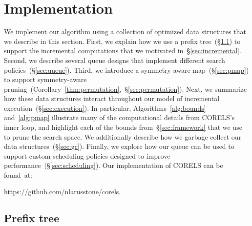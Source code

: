 

\section{Implementation}
\label{sec:implementation}

We implement our algorithm using a collection of optimized data structures
that we describe in this section.
%
First, we explain how we use a prefix tree~(\S\ref{sec:trie})
to support the incremental computations that we motivated in~\S\ref{sec:incremental}.
%
Second, we describe several queue designs
that implement different search policies~(\S\ref{sec:queue}).
%
Third, we introduce a symmetry-aware map~(\S\ref{sec:pmap}) to support
symmetry-aware pruning~(Corollary~\ref{thm:permutation},~\S\ref{sec:permutation}).
%
Next, we summarize how these data structures interact throughout
our model of incremental execution~(\S\ref{sec:execution}).
%
In particular, Algorithms~\ref{alg:bounds} and~\ref{alg:pmap} illustrate many
of the computational details from CORELS's inner loop, and highlight each of
the bounds from~\S\ref{sec:framework} that we use to prune the search space.
%
We additionally describe how we garbage collect our data structures~(\S\ref{sec:gc}).
%
Finally, we explore how our queue can be used to support
custom scheduling policies designed to improve performance~(\S\ref{sec:scheduling}).
%
Our implementation of CORELS can be found~at: \\

\centerline{\url{https://github.com/nlarusstone/corels}.}

\subsection{Prefix tree}
\label{sec:trie}

